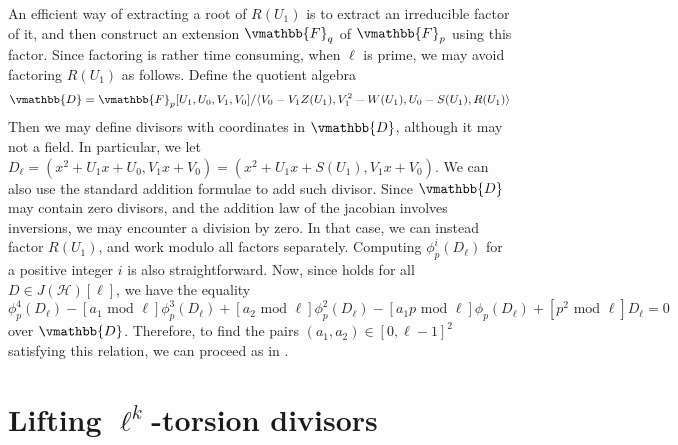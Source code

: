 An efficient way of extracting a root of $R(U_1)$ is to extract an irreducible factor of it, and 
then construct an extension $\vmathbb{F}_q$ of $\vmathbb{F}_p$ using this factor. Since factoring is 
rather time consuming, when $\ell$ is prime, we may avoid factoring $R(U_1)$ as follows. Define the 
quotient algebra 
$$
\vmathbb{D} = \vmathbb{F}_p[U_1, U_0, V_1, V_0] / \langle V_0 - V_1Z(U_1), V_1^2 - W(U_1), U_0 - 
S(U_1), R(U_1) \rangle
$$
Then we may define divisors with coordinates in $\vmathbb{D}$, although it may not a field. In 
particular, we let $D_\ell = (x^2 + U_1x + U_0, V_1x + V_0) = (x^2 + U_1x + S(U_1), V_1x + V_0)$. We 
can also use the standard addition formulae to add such divisor. Since $\vmathbb{D}$ may contain zero 
divisors, and the addition law of the jacobian involves inversions, we may encounter a division by 
zero. In that case, we can instead factor $R(U_1)$, and work modulo all factors separately. 
Computing $\phi_p^i(D_\ell)$ for a positive integer $i$ is also straightforward. Now, since 
 holds for all $D \in J(\mathcal{H})[\ell]$, we have the equality
$$
\phi_p^{4}(D_\ell) - [a_1 \text{ mod } \ell]\phi_p^{3}(D_\ell) + [a_2 \text{ mod } 
\ell]\phi_p^2(D_\ell) - [a_1p \text{ mod } \ell]\phi_p(D_\ell) + [p^2 \text{ mod } \ell]D_\ell = 0
$$
over $\vmathbb{D}$. Therefore, to find the pairs $(a_1, a_2) \in [0, \ell - 1]^2$ satisfying this 
relation, we can proceed as in . 











\section{Lifting $\ell^k$-torsion divisors}
\label{section:lift-ell-tors}

